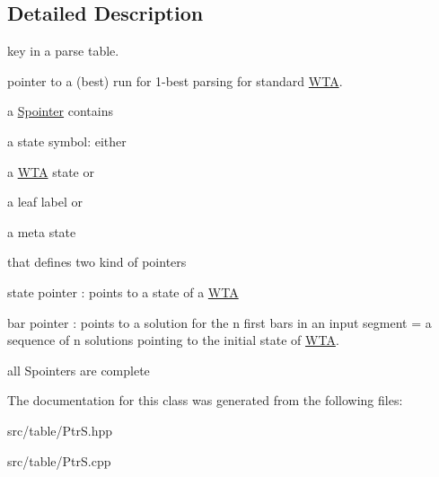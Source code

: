 \subsection{Detailed Description}
key in a parse table. 

pointer to a (best) run for 1-\/best parsing for standard \mbox{\hyperlink{classWTA}{W\+TA}}.

a \mbox{\hyperlink{classSpointer}{Spointer}} contains
\begin{DoxyItemize}
\item a state symbol\+: either
\begin{DoxyItemize}
\item a \mbox{\hyperlink{classWTA}{W\+TA}} state or
\item a leaf label or
\item a meta state
\end{DoxyItemize}
\end{DoxyItemize}

that defines two kind of pointers
\begin{DoxyItemize}
\item state pointer \+: points to a state of a \mbox{\hyperlink{classWTA}{W\+TA}}
\item bar pointer \+: points to a solution for the n first bars in an input segment = a sequence of n solutions pointing to the initial state of \mbox{\hyperlink{classWTA}{W\+TA}}.
\end{DoxyItemize}

all Spointers are complete 

The documentation for this class was generated from the following files\+:\begin{DoxyCompactItemize}
\item 
src/table/Ptr\+S.\+hpp\item 
src/table/Ptr\+S.\+cpp\end{DoxyCompactItemize}
